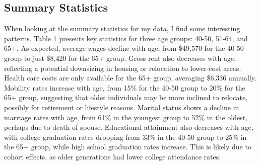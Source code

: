 \documentclass[11pt,a4paper]{article}
\begin{document}
\subsection{Summary Statistics}
\label{subsec:summary_statistics}

When looking at the summary statistics for my data, I find some interesting patterns. Table 1 presents key statistics for three age groups: 40-50, 51-64, and 65+. As expected, average wages decline with age, from \$49,570 for the 40-50 group to just \$8,420 for the 65+ group. Gross rent also decreases with age, reflecting a potential downsizing in housing or relocation to lower-cost areas. Health care costs are only available for the 65+ group, averaging \$6,336 annually. Mobility rates increase with age, from 15\% for the 40-50 group to 20\% for the 65+ group, suggesting that older individuals may be more inclined to relocate, possibly for retirement or lifestyle reasons. Marital status shows a decline in marriage rates with age, from 61\% in the youngest group to 52\% in the oldest, perhaps due to death of spouse. Educational attainment also decreases with age, with college graduation rates dropping from 33\% in the 40-50 group to 25\% in the 65+ group, while high school graduation rates increase. This is likely due to cohort effects, as older generations had lower college attendance rates.
\end{document}
